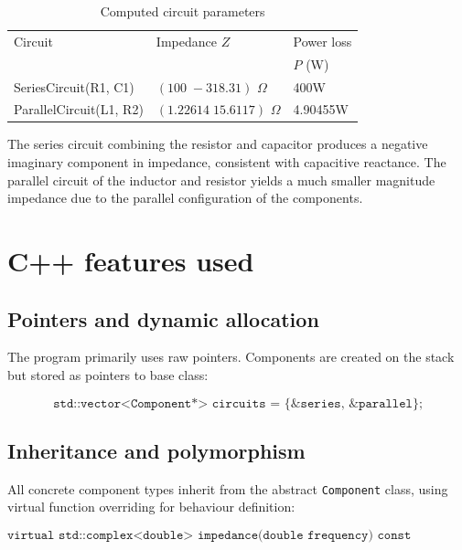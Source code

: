 \documentclass{article}
\begin{document}
    \begin{table}[h]
        \centering
        \caption{Computed circuit parameters}
        \begin{tabular}{lll}
            \hline
            Circuit & Impedance $Z$ & Power loss \\
            & & $P$ (W) \\
            \hline
            SeriesCircuit(R1, C1) & $(100\; -318.31)$ $\Omega$ & 400W \\
            ParallelCircuit(L1, R2) & $(1.22614\; 15.6117)$ $\Omega$ & 4.90455W \\
            \hline
        \end{tabular}
    \end{table}

    The series circuit combining the resistor and capacitor produces a negative imaginary component in impedance, consistent with capacitive reactance.
    The parallel circuit of the inductor and resistor yields a much smaller magnitude impedance due to the parallel configuration of the components.

    \section{C++ features used}
    \subsection{Pointers and dynamic allocation}
    The program primarily uses raw pointers. Components are created on the stack but stored as pointers to base class:
    
    \begin{equation*}
        \texttt{std::vector<Component*> circuits = \{\&series, \&parallel\};}
    \end{equation*}

    \subsection{Inheritance and polymorphism}
    All concrete component types inherit from the abstract \texttt{Component} class, using virtual function overriding for behaviour definition:
    
    \begin{equation*}
        \texttt{virtual std::complex<double> impedance(double frequency) const override;}
    \end{equation*}
\end{document}
